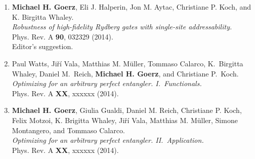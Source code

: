 \begin{enumerate}
  \item
  {\bf Michael H. Goerz}, Eli J. Halperin, Jon M. Aytac, Christiane P. Koch, and K.  Birgitta Whaley. \\
  {\it Robustness of high-fidelity Rydberg gates with single-site addressability.} \\
  Phys. Rev. A {\bf 90}, 032329 (2014). \\
  Editor's suggestion.

  \item
  Paul Watts, Ji\v{r}\'i Vala, Matthias M. M\"uller, Tommaso Calarco, K.\ Birgitta Whaley, Daniel M.\ Reich, {\bf Michael H. Goerz}, and Christiane P.\ Koch. \\
  {\it Optimizing for an arbitrary perfect entangler. I.~Functionals.} \\
  Phys. Rev. A {\bf XX}, xxxxxx (2014).

  \item
  {\bf Michael H. Goerz}, Giulia Gualdi, Daniel M. Reich, Christiane P. Koch, Felix Motzoi, K. Brigitta Whaley, Ji\v{r}\'i Vala, Matthias M. M\"uller, Simone Montangero, and Tommaso Calarco. \\
  {\it Optimizing for an arbitrary perfect entangler. II.~Application.} \\
  Phys. Rev. A {\bf XX}, xxxxxx (2014).

\end{enumerate}

